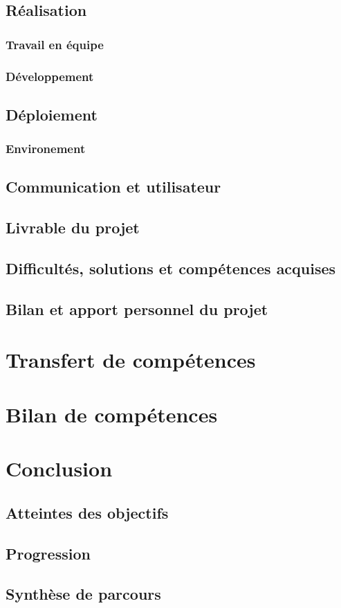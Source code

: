 \documentclass[12pt,a4paper]{report}
\begin{document}
\subsection{Réalisation}
\subsubsection{Travail en équipe}
\subsubsection{Développement}
\subsection{Déploiement}
\subsubsection{Environement}
\subsection{Communication et utilisateur}
\subsection{Livrable du projet}
\subsection{Difficultés, solutions et compétences acquises}
\subsection{Bilan et apport personnel du projet}

\newpage
\section{Transfert de compétences}

\newpage
\section{Bilan de compétences}

\newpage
\section{Conclusion}
\subsection{Atteintes des objectifs}
\subsection{Progression}
\subsection{Synthèse de parcours}
\end{document}
